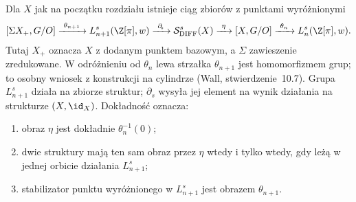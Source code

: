 \begin{twierdzenie}
\label{thm:exact-surgery-23}
Dla $X$ jak na początku rozdziału istnieje
ciąg zbiorów z punktami wyróżnionymi
\begin{equation}\label{eq:exact-surgery-23}
 [\Sigma X_+,G/O]\xrightarrow{\ \theta_{n+1}\ }
 L_{n+1}^s(\Z[\pi],w)
 \xrightarrow{\ \partial_{\!s}\ }
 \mathcal S^s_{\mathrm{DIFF}}(X)
 \xrightarrow{\ \eta\ }
 [X,G/O]
 \xrightarrow{\ \theta_n\ }
 L_n^s(\Z[\pi],w).
\end{equation}
Tutaj $X_+$ oznacza $X$ z dodanym punktem
bazowym, a $\Sigma$ zawieszenie zredukowane.
W odróżnieniu od $\theta_n$ lewa strzałka
$\theta_{n+1}$ jest homomorfizmem grup;
to osobny wniosek z konstrukcji na cylindrze
(Wall, stwierdzenie~10.7).
Grupa $L_{n+1}^s$ działa na zbiorze struktur;
$\partial_{\!s}$ wysyła jej element na wynik
działania na strukturze $(X,\id_X)$.
Dokładność oznacza:
\begin{enumerate}[label=(\roman*)]
\item obraz $\eta$ jest dokładnie
      $\theta_n^{-1}(0)$;
\item dwie struktury mają ten sam obraz
      przez $\eta$ wtedy i tylko wtedy,
      gdy leżą w jednej orbicie działania
      $L_{n+1}^s$;
\item stabilizator punktu wyróżnionego
      w $L_{n+1}^s$ jest obrazem
      $\theta_{n+1}$.
\end{enumerate}
\end{twierdzenie}


